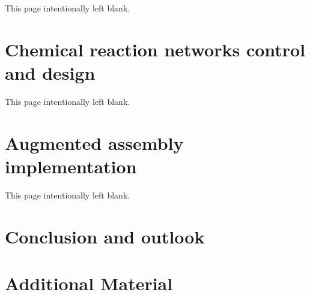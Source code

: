 \documentclass[letter,11pt,oneside]{report}
\begin{document}
\pagebreak
\thispagestyle{empty}
\begin{center}\tiny \sc This page intentionally left blank.\end{center}
\pagebreak


\chapter{Chemical reaction networks control and design} %
\label{cha:chemical_reaction_networks_control_and_design}
	

\pagebreak
\thispagestyle{empty}
\begin{center}\tiny \sc This page intentionally left blank.\end{center}
\pagebreak

\chapter{Augmented assembly implementation} %
\label{cha:augmented_assembly_implementation}
	

\pagebreak
\thispagestyle{empty}
\begin{center}\tiny \sc This page intentionally left blank.\end{center}
\pagebreak


\chapter{Conclusion and outlook} %
\label{cha:conclusion_and_outlook}
	

\chapter{Additional Material} %
\label{cha:additional_material}
	


\cleardoublepage
{}

\nocite{*}



\end{document}
